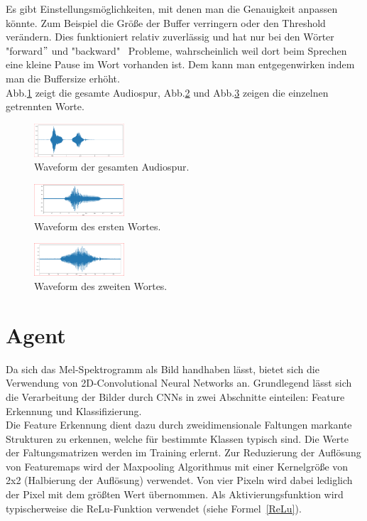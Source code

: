 \documentclass[sigconf]{acmart}
\begin{document}
\noindent Es gibt Einstellungsmöglichkeiten, mit denen man die Genauigkeit anpassen könnte. Zum Beispiel die Größe der Buffer verringern oder den Threshold verändern.
Dies funktioniert relativ zuverlässig und hat nur bei den Wörter "forward$"$ und "backward" \ Probleme, wahrscheinlich weil dort beim Sprechen eine kleine Pause im Wort vorhanden ist. Dem kann man entgegenwirken indem man die Buffersize erhöht. \\
Abb.\ref{fig:Audio} zeigt die gesamte Audiospur, Abb.\ref{fig:Audio1} und Abb.\ref{fig:Audio2} zeigen die einzelnen getrennten Worte.

\begin{figure}[ht]
  \includegraphics[width=0.3\textwidth]{images/Audio1}
  \caption{Waveform der gesamten Audiospur.}
  \Description{}
  \label{fig:Audio}
\end{figure} 
\begin{figure}[ht]
  \includegraphics[width=0.3\textwidth]{images/Audio2}
  \caption{Waveform des ersten Wortes.}
  \Description{}
  \label{fig:Audio1}
\end{figure} 
\begin{figure}[ht]
  \includegraphics[width=0.3\textwidth]{images/Audio3}
  \caption{Waveform des zweiten Wortes.}
  \Description{}
  \label{fig:Audio2}
\end{figure} 

\section{Agent}
Da sich das Mel-Spektrogramm als Bild handhaben lässt, bietet sich die Verwendung von 2D-Convolutional Neural Networks an. Grundlegend lässt sich die Verarbeitung der Bilder durch CNNs in zwei Abschnitte einteilen: Feature Erkennung und Klassifizierung.\\
Die Feature Erkennung dient dazu durch zweidimensionale Faltungen markante Strukturen zu erkennen, welche für bestimmte Klassen typisch sind. Die Werte der Faltungsmatrizen werden im Training erlernt. Zur Reduzierung der Auflösung von Featuremaps wird der Maxpooling Algorithmus mit einer Kernelgröße von 2x2 (Halbierung der Auflösung) verwendet. Von vier Pixeln wird dabei lediglich der Pixel mit dem größten Wert übernommen. Als Aktivierungsfunktion wird typischerweise die ReLu-Funktion verwendet (siehe Formel~\ref{ReLu}). 
\end{document}
